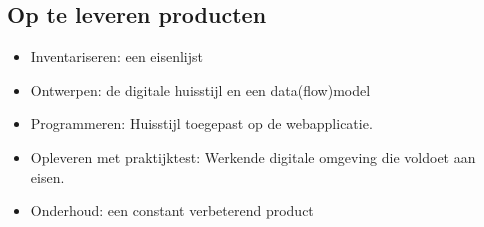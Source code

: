 \documentclass{verslag}
\begin{document}
    \subsection{Op te leveren producten} %
    \label{sub:op_te_leveren_producten}
    \begin{itemize}
        \item Inventariseren: een eisenlijst
        \item Ontwerpen: de digitale huisstijl en een data(flow)model
        \item Programmeren: Huisstijl toegepast op de webapplicatie.
        \item Opleveren met praktijktest: Werkende digitale omgeving die voldoet aan eisen.
        \item Onderhoud: een constant verbeterend product
    \end{itemize}
\end{document}
